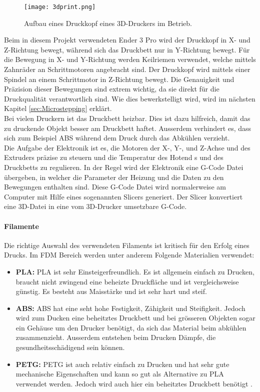 \begin{figure}[h]
	\centering
	\texttt{[image: 3dprint.png]}
	\caption{Aufbau eines Druckkopf eines 3D-Druckers im Betrieb.}
	\label{pic:Printhead}
\end{figure}

Beim in diesem Projekt verwendeten Ender 3 Pro wird der Druckkopf in X- und Z-Richtung bewegt, während sich das Druckbett nur in Y-Richtung bewegt. Für die Bewegung in X- und Y-Richtung werden Keilriemen verwendet, welche mittels Zahnräder an Schrittmotoren angebracht sind. Der Druckkopf wird mittels einer Spindel an einem Schrittmotor in Z-Richtung bewegt. Die Genauigkeit und Präzision dieser Bewegungen sind extrem wichtig, da sie direkt für die Druckqualität verantwortlich sind. Wie dies bewerkstelligt wird, wird im nächsten Kapitel \ref{sec:Microstepping} erklärt.\\
Bei vielen Druckern ist das Druckbett heizbar. Dies ist dazu hilfreich, damit das zu druckende Objekt besser am Druckbett haftet. Ausserdem verhindert es, dass sich zum Beispiel ABS während dem Druck durch das Abkühlen verzieht.\\
Die Aufgabe der Elektronik ist es, die Motoren der X-, Y-, und Z-Achse und des Extruders präzise zu steuern und die Temperatur des Hotend s und des Druckbetts zu regulieren. In der Regel wird der Elektronik eine G-Code Datei übergeben, in welcher die Parameter der Heizung und die Daten zu den Bewegungen enthalten sind. Diese G-Code Datei wird normalerweise am Computer mit Hilfe eines sogenannten Slicers generiert. Der Slicer konvertiert eine 3D-Datei in eine vom 3D-Drucker umsetzbare G-Code.

\paragraph{Filamente}
Die richtige Auswahl des verwendeten Filaments ist kritisch für den Erfolg eines Drucks. Im FDM Bereich werden unter anderem Folgende Materialien verwendet:
\begin{itemize}
    \item \textbf{PLA:} PLA ist sehr Einsteigerfreundlich. Es ist allgemein einfach zu Drucken, braucht nicht zwingend eine beheizte Druckfläche und ist vergleichsweise günstig. Es besteht aus Maisstärke und ist sehr hart und steif.
    \item \textbf{ABS:} ABS hat eine seht hohe Festigkeit, Zähigkeit und Steifigkeit. Jedoch wird zum Ducken eine beheitztes Druckbett und bei grösseren Objekten sogar ein Gehäuse um den Drucker benötigt, da sich das Material beim abkühlen zusammenzieht. Ausserdem entstehen beim Drucken Dämpfe, die gesundheitsschädigend sein können.
    \item \textbf{PETG:} PETG ist auch relativ einfach zu Drucken und hat sehr gute mechanische Eigenschaften und kann so gut als Alternative zu PLA verwendet werden. Jedoch wird auch hier ein beheitztes Druckbett benötigt \cite{Filaments}.
\end{itemize}


